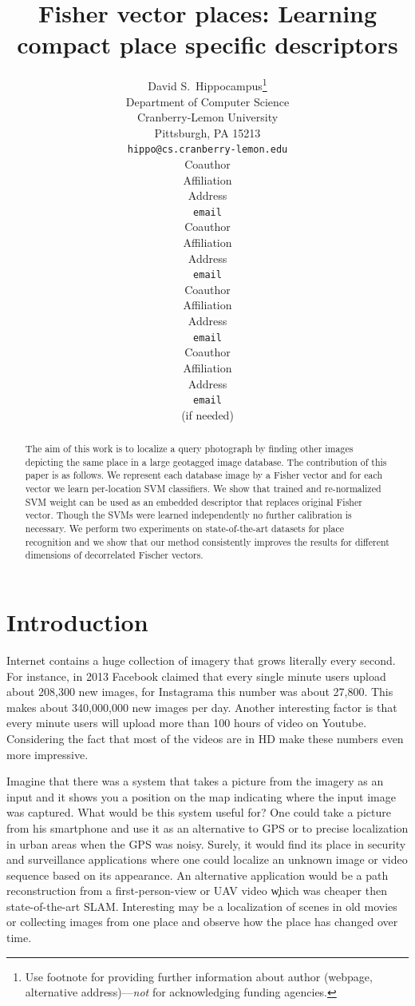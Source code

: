 \documentclass[table]{article} %
\title{Fisher vector places: Learning compact place specific descriptors}
\author{
David S.~Hippocampus\thanks{ Use footnote for providing further information
about author (webpage, alternative address)---\emph{not} for acknowledging
funding agencies.} \\
Department of Computer Science\\
Cranberry-Lemon University\\
Pittsburgh, PA 15213 \\
\texttt{hippo@cs.cranberry-lemon.edu} \\
\And
Coauthor \\
Affiliation \\
Address \\
\texttt{email} \\
\AND
Coauthor \\
Affiliation \\
Address \\
\texttt{email} \\
\And
Coauthor \\
Affiliation \\
Address \\
\texttt{email} \\
\And
Coauthor \\
Affiliation \\
Address \\
\texttt{email} \\
(if needed)\\
}
\begin{document}
{%
    \maketitle
    \begin{center}
        \centering
        \vspace*{-10mm}
        \fbox{\rule[-.5cm]{0cm}{4cm} \rule[-.5cm]{14cm}{0cm}}
    \end{center}%
}

\begin{abstract}
	The aim of this work is to localize a query photograph by finding other images depicting the same place in a large geotagged image database. The contribution of this paper is as follows. We represent each database image by a Fisher vector and for each vector we learn per-location SVM classifiers. We show that trained and re-normalized SVM weight can be used as an embedded descriptor that replaces original Fisher vector. Though the SVMs were learned independently no further calibration is necessary. We perform two experiments on state-of-the-art datasets for place recognition and we show that our method consistently improves the results for different dimensions of decorrelated Fischer vectors.
\end{abstract}

\section{Introduction}
	Internet contains a huge collection of imagery that grows  literally every second. For instance, in 2013 Facebook claimed \cite{imageGrow} that every single minute users upload about 208,300 new images, for Instagrama this number was about  27,800. This makes about 340,000,000 new images per day. Another interesting factor is that every minute users will upload more than 100 hours of video on Youtube. Considering the fact that most of the videos are in HD make these numbers even more impressive.

	Imagine that there was a system that takes a picture from the imagery as an input and it shows you a position on the map indicating where the input image was captured. What would be this system useful for? One could take a picture from his smartphone and use it as an alternative to GPS or to precise localization in urban areas when the GPS was noisy. Surely, it would find its place in security and surveillance applications where one could localize an unknown image or video sequence based on its appearance. An alternative application would be a path reconstruction from a first-person-view or UAV video \c which was cheaper then state-of-the-art SLAM. Interesting may be a localization of scenes in old movies or collecting images from one place and observe how the place has changed over time.
\end{document}
